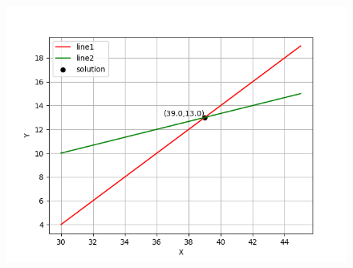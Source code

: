 \documentclass[journal]{IEEEtran}
\begin{document}
\begin{figure}[h!]
   \centering
   \includegraphics[width=0.75\columnwidth]{figs/Figure_1.png}
\end{figure}
\end{document}
